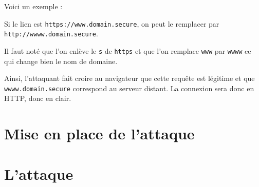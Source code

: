 Voici un exemple :

Si le lien est \verb+https://www.domain.secure+, on peut le remplacer par \verb+http://wwww.domain.secure+.

Il faut noté que l'on enlève le \verb+s+ de \verb+https+ et que l'on remplace \verb+www+ par \verb+wwww+ ce qui change bien le nom de domaine.

Ainsi, l'attaquant fait croire au navigateur que cette requête est légitime et que \verb+wwww.domain.secure+ correspond au serveur distant. La connexion sera donc en HTTP, donc en clair.

\section{Mise en place de l'attaque}

\section{L'attaque}
